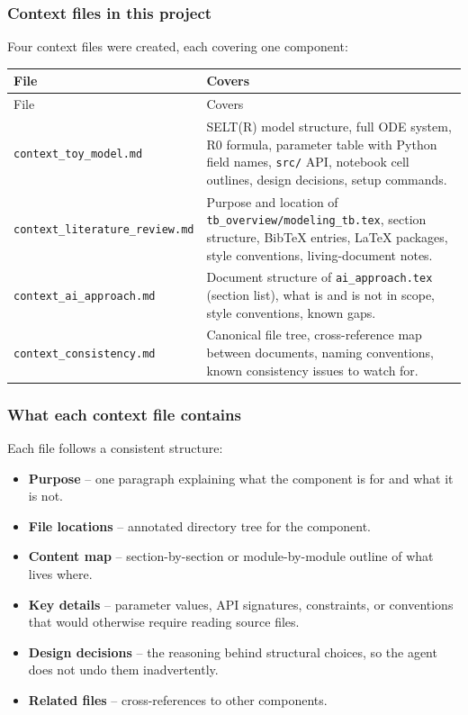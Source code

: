 \documentclass[11pt]{article}
\begin{document}
\subsubsection{Context files in this project}

Four context files were created, each covering one component:

\begin{longtable}{@{}p{5.2cm}p{8.1cm}@{}}
\toprule
File & Covers \\
\midrule
\endfirsthead
\toprule
File & Covers \\
\midrule
\endhead
\texttt{context\_toy\_model.md} & SELT(R) model structure, full ODE system, R0 formula, parameter table with Python field names, \texttt{src/} API, notebook cell outlines, design decisions, setup commands. \\
\texttt{context\_literature\_review.md} & Purpose and location of \texttt{tb\_overview/modeling\_tb.tex}, section structure, BibTeX entries, LaTeX packages, style conventions, living-document notes. \\
\texttt{context\_ai\_approach.md} & Document structure of \texttt{ai\_approach.tex} (section list), what is and is not in scope, style conventions, known gaps. \\
\texttt{context\_consistency.md} & Canonical file tree, cross-reference map between documents, naming conventions, known consistency issues to watch for. \\
\bottomrule
\end{longtable}

\subsubsection{What each context file contains}

Each file follows a consistent structure:
\begin{itemize}[noitemsep]
  \item \textbf{Purpose} -- one paragraph explaining what the component is for and what it is not.
  \item \textbf{File locations} -- annotated directory tree for the component.
  \item \textbf{Content map} -- section-by-section or module-by-module outline of what lives where.
  \item \textbf{Key details} -- parameter values, API signatures, constraints, or conventions that would otherwise require reading source files.
  \item \textbf{Design decisions} -- the reasoning behind structural choices, so the agent does not undo them inadvertently.
  \item \textbf{Related files} -- cross-references to other components.
\end{itemize}
\end{document}
